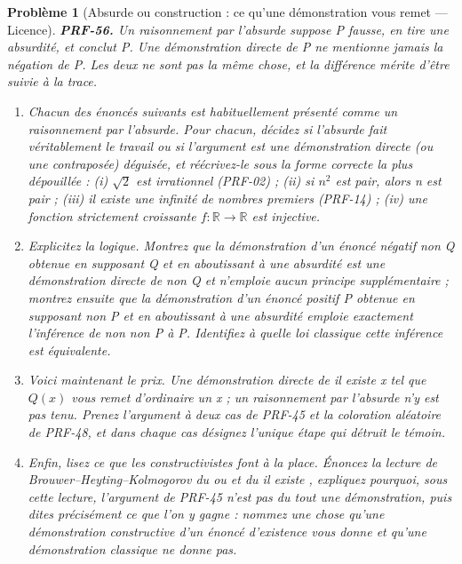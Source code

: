 \documentclass[11pt]{article}
\newtheorem{problem}{Problème}
\begin{document}
\begin{problem}[{Absurde ou construction : ce qu'une démonstration vous remet --- Licence}]
\textbf{PRF-56.} Un raisonnement par l'absurde suppose P fausse, en tire une absurdité,
et conclut P. Une démonstration directe de P ne mentionne jamais la négation de P. Les deux
ne sont pas la même chose, et la différence mérite d'être suivie à la trace.
\begin{enumerate}
\item[(a)] Chacun des énoncés suivants est habituellement présenté comme un raisonnement par
l'absurde. Pour chacun, décidez si l'absurde fait véritablement le travail ou si l'argument
est une démonstration directe (ou une contraposée) déguisée, et réécrivez-le sous la forme
correcte la plus dépouillée : (i) $ \sqrt{2} $ est irrationnel (PRF-02) ; (ii) si
$ n^2 $ est pair, alors n est pair ; (iii) il existe une infinité de nombres premiers
(PRF-14) ; (iv) une fonction strictement croissante
$ f\colon \mathbb{R} \to \mathbb{R} $ est injective.
\item[(b)] Explicitez la logique. Montrez que la démonstration d'un énoncé \textit{négatif} \og{} non Q \fg{}
obtenue en supposant Q et en aboutissant à une absurdité est une démonstration directe de
\og{} non Q \fg{} et n'emploie aucun principe supplémentaire ; montrez ensuite que la démonstration
d'un énoncé \textit{positif} P obtenue en supposant \og{} non P \fg{} et en aboutissant à une
absurdité emploie exactement l'inférence de \og{} non non P \fg{} à P. Identifiez à quelle loi
classique cette inférence est équivalente.
\item[(c)] Voici maintenant le prix. Une démonstration directe de \og{} il existe x tel que
$ Q(x) $ \fg{} vous remet d'ordinaire un x ; un raisonnement par l'absurde n'y est pas tenu.
Prenez l'argument à deux cas de PRF-45 et la coloration aléatoire de PRF-48, et dans chaque
cas désignez l'unique étape qui détruit le témoin.
\item[(d)] Enfin, lisez ce que les constructivistes font à la place. Énoncez la lecture de
Brouwer--Heyting--Kolmogorov du \og{} ou \fg{} et du \og{} il existe \fg{}, expliquez pourquoi, sous cette
lecture, l'argument de PRF-45 n'est pas du tout une démonstration, puis dites précisément ce
que l'on y gagne : nommez une chose qu'une démonstration constructive d'un énoncé
d'existence vous donne et qu'une démonstration classique ne donne pas.
\end{enumerate}

\end{problem}
\end{document}

